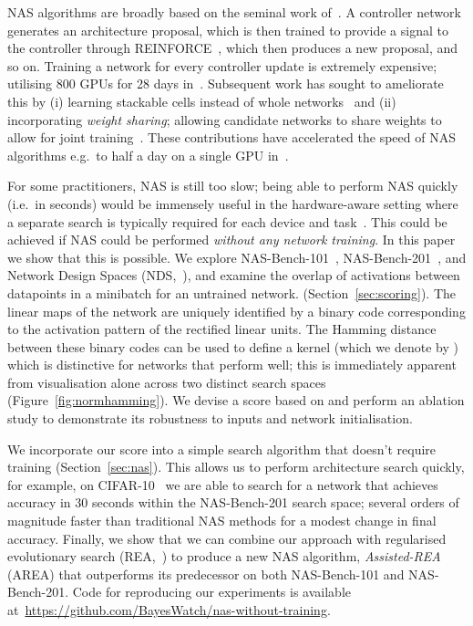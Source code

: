 \documentclass{article}
\newcommand{\maybebf}[0]{}
\begin{document}
NAS algorithms are broadly based on the seminal work of~\cite{zoph2017neural}. A controller network generates an architecture proposal, which is then trained to provide a signal to the controller through REINFORCE~\citep{williams1992simple}, which then produces a new proposal, and so on. Training a network for every controller update is extremely expensive; utilising 800 GPUs for 28 days in~\cite{zoph2017neural}. Subsequent work has sought to ameliorate this by (i) learning stackable cells instead of whole networks~\citep{zoph2018learning} and (ii) incorporating {\it weight sharing}; allowing candidate networks to share weights to allow for joint training~\citep{pham2018efficient}. These contributions have accelerated the speed of NAS algorithms e.g.\ to half a day on a single GPU in~\cite{pham2018efficient}.

For some practitioners, NAS is still too slow; being able to perform NAS quickly (i.e.\ in seconds) would be immensely useful in the hardware-aware setting where a separate search is typically required for each device and task~\citep{wu2019fbnet,tan2019mnasnet}. This could be achieved if NAS could be performed {\it without any network training}. In this paper {\maybebf we show that this is possible}. We explore NAS-Bench-101~\citep{ying2019bench}, NAS-Bench-201~\citep{Dong2020NAS-Bench-201}, and Network Design Spaces (NDS,~\citealp{radosavovic2019network}), and examine the overlap of activations between datapoints in a minibatch for an {\maybebf untrained} network. (Section~\ref{sec:scoring}). The linear maps of the network are uniquely identified by a binary code corresponding to the activation pattern of the rectified linear units. The Hamming distance between these binary codes can be used to define a kernel (which we denote by ) which is distinctive for networks that perform well; this is immediately apparent from visualisation alone across two distinct search spaces (Figure~\ref{fig:normhamming}). We devise a score based on  and perform an ablation study to demonstrate its robustness to inputs and network initialisation.

We incorporate our score into a simple search algorithm that {\maybebf doesn't require training} (Section~\ref{sec:nas}). This allows us to perform architecture search quickly, for example, on CIFAR-10~\citep{krizhevsky2009learning} we are able to search for a network that achieves  accuracy in 30 seconds within the NAS-Bench-201 search space; several orders of magnitude faster than traditional NAS methods for a modest change in final accuracy. Finally, we show that we can combine our approach with regularised evolutionary search (REA,~\citealp{pham2018efficient}) to produce a new NAS algorithm, {\it Assisted-REA} (AREA) that outperforms its predecessor on both NAS-Bench-101 and NAS-Bench-201. Code for reproducing our experiments is available at~\url{https://github.com/BayesWatch/nas-without-training}.
\end{document}
